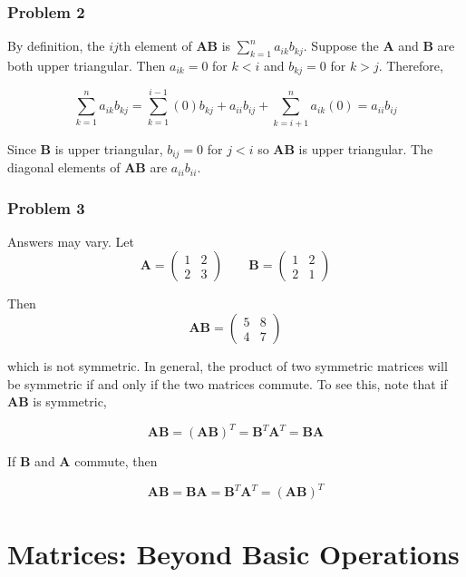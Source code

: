 \documentclass{beamer}
\begin{document}
\begin{frame}
\frametitle{Problem 2}
By definition, the $ij$th element of $\mathbf{AB}$ is $\sum_{k=1}^n a_{ik} b_{kj}$.  Suppose the $\mathbf{A}$ and $\mathbf{B}$ are both upper triangular.  Then $a_{ik} = 0$ for $k < i$ and $b_{kj} = 0$ for $k > j$.  Therefore,

$$\sum_{k = 1}^n a_{ik}b_{kj} = \sum_{k = 1}^{i-1} (0)b_{kj} + a_{ii}b_{ij} + \sum_{k = i+1}^n a_{ik}(0) = a_{ii}b_{ij}$$

Since $\mathbf{B}$ is upper triangular, $b_{ij} = 0$ for $j < i$ so $\mathbf{AB}$ is upper triangular.  The diagonal elements of $\mathbf{AB}$ are $a_{ii}b_{ii}$.
\end{frame}

\begin{frame}
\frametitle{Problem 3}
Answers may vary.  Let $$\mathbf{A} = \begin{pmatrix} 1 & 2 \\ 2 & 3\end{pmatrix} \qquad \mathbf{B} = \begin{pmatrix} 1 & 2 \\ 2 & 1 \end{pmatrix}$$

Then
$$\mathbf{AB} = \begin{pmatrix} 5 & 8 \\ 4 & 7\end{pmatrix} $$

which is not symmetric.  In general, the product of two symmetric matrices will be symmetric if and only if the two matrices commute.  To see this, note that if $\mathbf{AB}$ is symmetric,

$$\mathbf{AB} = \mathbf{(AB)}^T = \mathbf{B}^T\mathbf{A}^T = \mathbf{BA}$$

If $\mathbf{B}$ and $\mathbf{A}$ commute, then

$$\mathbf{AB} = \mathbf{BA} = \mathbf{B}^T\mathbf{A}^T = \mathbf{(AB)}^T $$
\end{frame}

\section{Matrices: Beyond Basic Operations}
\end{document}

